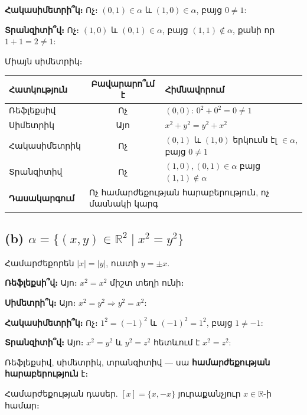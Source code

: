 \documentclass[12pt, a4paper]{article}
\newcommand{\R}{\mathbb{R}}
\begin{document}
\textbf{Հակասիմետրի՞կ։} Ոչ։ $(0, 1) \in \alpha$ և $(1, 0) \in \alpha$, բայց $0 \ne 1$:

\textbf{Տրանզիտի՞վ։} Ոչ։ $(1, 0)$ և $(0, 1) \in \alpha$, բայց $(1, 1) \notin \alpha$, քանի որ $1 + 1 = 2 \ne 1$:

\begin{answerbox}
Միայն սիմետրիկ։
\end{answerbox}

\begin{center}
\renewcommand{\arraystretch}{1.15}
\begin{tabular}{l|c|l}
  \toprule
  \textbf{Հատկություն} & \textbf{Բավարարո՞ւմ է} & \textbf{Հիմնավորում} \\
  \midrule
  Ռեֆլեքսիվ      & Ոչ  & $(0,0)$: $0^2+0^2=0\ne1$ \\
  Սիմետրիկ      & Այո & $x^2+y^2 = y^2+x^2$ \\
  Հակասիմետրիկ  & Ոչ  & $(0,1)$ և $(1,0)$ երկուսն էլ $\in\alpha$, բայց $0\ne1$ \\
  Տրանզիտիվ     & Ոչ  & $(1,0),(0,1)\in\alpha$ բայց $(1,1)\notin\alpha$ \\
  \midrule
  \textbf{Դասակարգում} & \multicolumn{2}{l}{Ոչ համարժեքության հարաբերություն, ոչ մասնակի կարգ} \\
  \bottomrule
\end{tabular}
\end{center}

\subsection*{(b)\; $\alpha = \{(x,y) \in \R^2 \mid x^2 = y^2\}$}

Համարժեքորեն $|x| = |y|$, ուստի $y = \pm x$.

\textbf{Ռեֆլեքսի՞վ։} Այո։ $x^2 = x^2$ միշտ տեղի ունի։ \checkmark

\textbf{Սիմետրի՞կ։} Այո։ $x^2 = y^2 \Rightarrow y^2 = x^2$: \checkmark

\textbf{Հակասիմետրի՞կ։} Ոչ։ $1^2 = (-1)^2$ և $(-1)^2 = 1^2$, բայց $1 \ne -1$:

\textbf{Տրանզիտի՞վ։} Այո։ $x^2 = y^2$ և $y^2 = z^2$ հետևում է $x^2 = z^2$: \checkmark

\begin{answerbox}
Ռեֆլեքսիվ, սիմետրիկ, տրանզիտիվ — սա \textbf{համարժեքության հարաբերություն} է։

Համարժեքության դասեր. $[x] = \{x, -x\}$ յուրաքանչյուր $x \in \R$-ի համար։
\end{answerbox}
\end{document}
